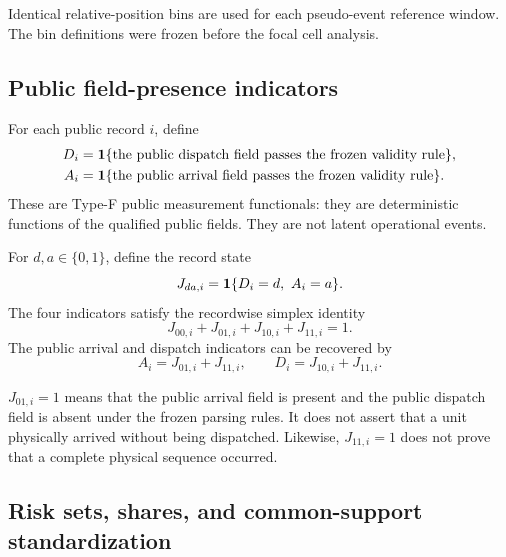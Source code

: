 \documentclass[11pt]{article}
\begin{document}
Identical relative-position bins are used for each pseudo-event reference window. The bin definitions were frozen before the focal cell analysis.

\subsection{Public field-presence indicators}

For each public record $i$, define
\begin{align}
D_i&=\mathbf{1}\{\text{the public dispatch field passes the frozen validity rule}\},\\
A_i&=\mathbf{1}\{\text{the public arrival field passes the frozen validity rule}\}.
\end{align}
These are Type-F public measurement functionals: they are deterministic functions of the qualified public fields. They are not latent operational events.

For $d,a\in\{0,1\}$, define the record state
\begin{equation}
J_{da,i}=\mathbf{1}\{D_i=d,\ A_i=a\}.
\label{eq:Jrecord}
\end{equation}
The four indicators satisfy the recordwise simplex identity
\begin{equation}
J_{00,i}+J_{01,i}+J_{10,i}+J_{11,i}=1.
\label{eq:recordsimplex}
\end{equation}
The public arrival and dispatch indicators can be recovered by
\begin{equation}
A_i=J_{01,i}+J_{11,i},
\qquad
D_i=J_{10,i}+J_{11,i}.
\label{eq:marginalidentities}
\end{equation}

\begin{definitionbox}[title=Interpretive firewall]
$J_{01,i}=1$ means that the public arrival field is present and the public dispatch field is absent under the frozen parsing rules. It does not assert that a unit physically arrived without being dispatched. Likewise, $J_{11,i}=1$ does not prove that a complete physical sequence occurred.
\end{definitionbox}

\subsection{Risk sets, shares, and common-support standardization}
\end{document}
